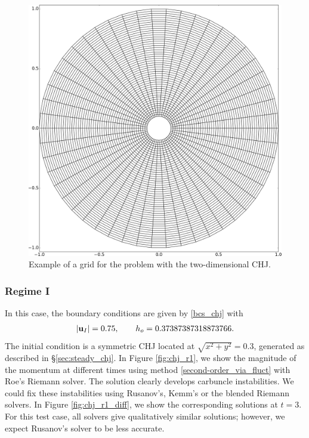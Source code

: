 \documentclass[preprint, 11pt]{article}
\newcommand{\bfu}{{\bf u}}
\begin{document}
\begin{figure}[!h]
  \centering 
  \includegraphics[scale=0.15]{figures/mesh.png}
  \caption{
    Example of a grid for the problem with the two-dimensional CHJ.
    \label{fig:mesh_chj}}
\end{figure}

\subsubsection{Regime I}
In this case, the boundary conditions are given by \eqref{bcs_chj} with
\begin{align}\label{bcs_chj_r1}
  |\bfu_I|=0.75, \qquad h_o=0.37387387318873766. 
\end{align}
The initial condition is a symmetric CHJ located at $\sqrt{x^2+y^2}=0.3$, generated as described in \S \ref{sec:steady_chj}.
In Figure \ref{fig:chj_r1}, we show the magnitude of the momentum at different times using
method \eqref{second-order_via_fluct} with Roe's Riemann solver.
The solution clearly develops carbuncle instabilities.
We could fix these instabilities using Rusanov's, Kemm's or the blended Riemann solvers. 
In Figure \ref{fig:chj_r1_diff}, we show the corresponding solutions at $t=3$.
For this test case, all solvers give qualitatively similar solutions;
however, we expect Rusanov's solver to be less accurate. 
\end{document}
